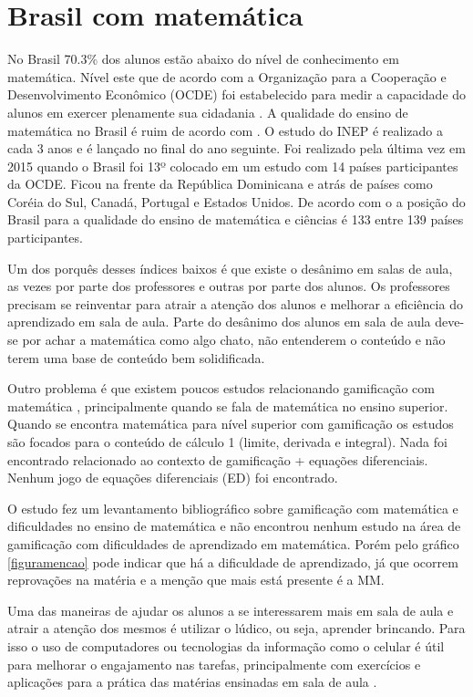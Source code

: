 
\section[Brasil com matemática]{Brasil com matemática}
No Brasil 70.3\% dos alunos estão abaixo do nível de conhecimento em matemática. Nível este que de acordo com a Organização para a Cooperação e Desenvolvimento Econômico (OCDE) foi estabelecido para medir a capacidade do alunos em exercer plenamente sua cidadania \cite{inep2015nivelcidadania}. A qualidade do ensino de matemática no Brasil é ruim de acordo com \cite{indiceRuimMat} \cite{inep2015}. O estudo do INEP é realizado a cada 3 anos e é lançado no final do ano seguinte. Foi realizado pela última vez em 2015 quando o Brasil foi 13º colocado em um estudo com 14 países participantes da OCDE. Ficou na frente da República Dominicana e atrás de países como Coréia do Sul, Canadá, Portugal e Estados Unidos. De acordo com o \cite{indiceRuimMat} a posição do Brasil para a qualidade do ensino de matemática e ciências é 133 entre 139 países participantes.

Um dos porquês desses índices baixos é que existe o desânimo em salas de aula, as vezes por parte dos professores e outras por parte dos alunos. Os professores precisam se reinventar para atrair a atenção dos alunos e melhorar a eficiência do aprendizado em sala de aula. Parte do desânimo dos alunos em sala de aula deve-se por achar a matemática como algo chato, não entenderem o conteúdo e não terem uma base de conteúdo bem solidificada.

Outro problema é que existem poucos estudos relacionando gamificação com matemática \cite{revbibmatgam}, principalmente quando se fala de matemática no ensino superior. Quando se encontra matemática para nível superior com gamificação os estudos são focados para o conteúdo de cálculo 1 (limite, derivada e integral). Nada foi encontrado relacionado ao contexto de gamificação + equações diferenciais. Nenhum jogo de equações diferenciais (ED) foi encontrado.

O estudo \cite{revbibmatgam} fez um levantamento bibliográfico sobre gamificação com matemática e dificuldades no ensino de matemática e não encontrou nenhum estudo na área de gamificação com dificuldades de aprendizado em matemática. Porém pelo gráfico \ref{figuramencao} pode indicar que há a dificuldade de aprendizado, já que ocorrem reprovações na matéria e a menção que mais está presente é a MM.

Uma das maneiras de ajudar os alunos a se interessarem mais em sala de aula e atrair a atenção dos mesmos é utilizar o lúdico, ou seja, aprender brincando. Para isso o uso de computadores ou tecnologias da informação como o celular é útil para melhorar o engajamento nas tarefas, principalmente com exercícios e aplicações para a prática das matérias ensinadas em sala de aula \cite{tdahNasEscolas2}.

